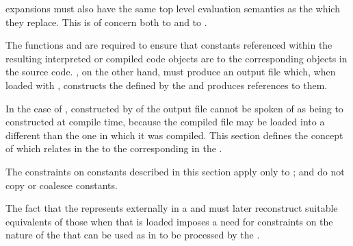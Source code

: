  expansions must also have the same
top level evaluation semantics as the  which they replace.
This is of concern both to  and to
.

\endsubsubsubsection%

\endsubsubsection%

\endsubSection%

%  
%  



The functions  and  are
required to ensure that constants referenced within the resulting
interpreted or compiled code objects are  to the
corresponding objects in the source code.  ,
on the other hand, must produce an output file which, when loaded with
, constructs the  defined by the
 and produces references to them.
 
In the case of , 
constructed by  of the output file cannot be spoken
of as being  to  constructed at
compile time, because the compiled file may be loaded into a different
 than the one in which it was compiled.  This section
defines the concept of  which relates
 in the  to the
corresponding  in the .
 
The constraints on constants described in this section apply only
to ;  and 
do not copy or coalesce constants.


The fact that the  represents   
externally in a  and must later reconstruct suitable 
equivalents of those  when that  is loaded
imposes a need for constraints on the nature of the  that can be 
used as   in  to be processed 
by the .

